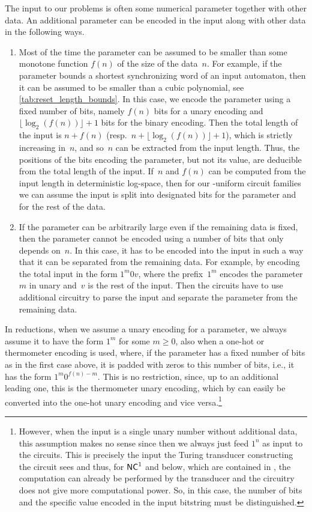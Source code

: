 The input to our problems is often some numerical parameter together with other data.
An additional parameter can be encoded in the input along with other data
in the following ways.
\begin{enumerate}
	\item Most of the time the parameter can be assumed to be smaller than some
	monotone function $f(n)$ of the size of the data~$n$.
	For example, if the parameter bounds a shortest synchronizing word of an input automaton,
	then it can be assumed to be smaller
	than a cubic polynomial, see \cref{tab:reset_length_bounds}.
	In this case, we encode the parameter using a fixed number of bits,
	namely $f(n)$ bits for a unary encoding
	and $\lfloor \log_2(f(n)) \rfloor + 1$ bits for the binary encoding.
	Then the total length of the input is
	$n + f(n)$ (resp.~$n + \lfloor \log_2(f(n)) \rfloor + 1$),
	which is strictly increasing in~$n$,
	and so~$n$ can be extracted from the input length.
	Thus, the positions of the bits encoding the parameter, but not its value,
	are deducible from the total length of the input.
	If~$n$ and $f(n)$ can be computed from the input length in deterministic log-space, then
	for our \LOGSPACE-uniform circuit families we can assume the input
	is split into designated bits for the parameter and for the rest of the data.
	
	\item If the parameter can be arbitrarily large even if the remaining
	data is fixed, then the parameter cannot be encoded using a number of bits
	that only depends on~$n$.
	In this case, it has to be encoded into the input in such a way
	that it can be separated from the remaining data. For example,
	by encoding the total input in the form $1^m0v$, where the prefix~$1^m$ encodes
	the parameter~$m$ in unary and~$v$ is the rest of the input. Then the circuits
	have to use additional circuitry to parse the input and separate the
	parameter from the remaining data.
\end{enumerate}

In reductions, when we assume a unary encoding for a parameter,
we always assume it to have the form $1^m$ for some $m \ge 0$,
also when a one-hot or thermometer encoding is used,
where, if the parameter has a fixed number of bits as in the first case above,
it is padded with zeros to this number of bits, i.e.,
it has the form $1^m 0^{f(n)-m}$.
This is no restriction, since, up to an additional leading one,
this is the thermometer unary encoding,
which by 
can easily be converted into the one-hot unary encoding and vice versa.\footnote{However, when
	the input is a single unary number without additional data,
	this assumption makes no sense since then we always just feed $1^n$
	as input to the circuits. This is precisely the input the Turing transducer constructing
	the circuit sees and thus, for $\textup{\textsf{NC}}^1$ and below, which are contained in \LOGSPACE,
	the computation can already be performed by the transducer
	and the circuitry does not give more computational power.
	So, in this case, the number of bits and the
	specific value encoded in the input bitstring must be distinguished.}

